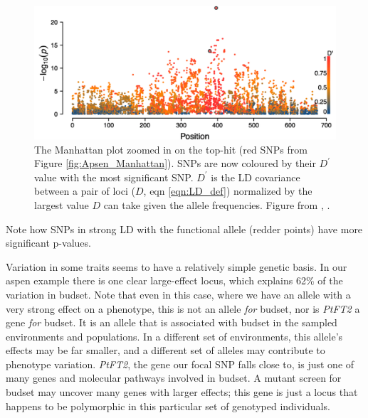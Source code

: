 \begin{figure}
\begin{center}
\includegraphics[width=\textwidth]{Journal_figs/Quant_gen/Wang_GWAS_poplar/Wang_Fig_zoomed_Manhattan.pdf}
\end{center}
\caption{The Manhattan plot zoomed in on the top-hit (red SNPs from Figure
  \ref{fig:Apsen_Manhattan}). SNPs are now coloured by their $D^{\prime}$
  value with the most significant SNP. $D^{\prime}$ is the LD
  covariance between a pair of loci ($D$, eqn \eqref{eqn:LD_def}) normalized by
  the largest value $D$ can take given the allele frequencies. Figure from \citet{wang:18},  \PLOSccBY. } \label{fig:Apsen_zoom_Manhattan}
\end{figure}
Note how SNPs in strong LD with the functional allele (redder
points) have more significant p-values. 

Variation in some traits seems to have a relatively simple genetic
basis. In our aspen example there is one clear large-effect locus,
which explains  62\% of the variation in budset. Note that even in
this case, where we have an allele with a very strong effect on a
phenotype, this is not an allele {\it for} budset, nor is {\it PtFT2} a gene {\it for} budset.  It is an allele that is associated with budset in the sampled
environments and populations. In a different set of environments, this
allele's effects may be far smaller, and a different set of alleles
may contribute to phenotype variation. {\it PtFT2}, the gene our focal SNP falls close to, is just one of many genes and molecular pathways involved in budset. A mutant screen for budset may uncover many genes with larger effects; this gene is just a locus that happens to be polymorphic in this particular set of genotyped individuals. 

